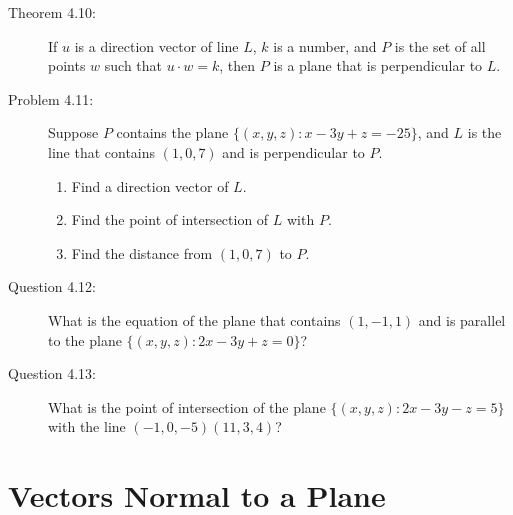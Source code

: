 \documentclass{article}
\begin{document}
\begin{description}
  \item[Theorem 4.10:] If $u$ is a direction vector of line $L$, $k$ is a number, and $P$ is the set of all points $w$ such that $u \cdot w = k$, then $P$ is a plane that is perpendicular to $L$.

  \item[Problem 4.11:] Suppose $P$ contains the plane $\{ (x,y,z): x-3y+z = -25 \}$, and $L$ is the line that contains $(1, 0, 7)$ and is perpendicular to $P$.
    \begin{enumerate}[\hspace{1cm}(a)]
      \item Find a direction vector of $L$.
      \item Find the point of intersection of $L$ with $P$.
      \item Find the distance from $(1, 0, 7)$ to $P$.
    \end{enumerate}

  \item[Question 4.12:] What is the equation of the plane that contains $(1, -1, 1)$ and is parallel to the plane $\{ (x,y,z): 2x-3y+z = 0 \}$?

  \item[Question 4.13:] What is the point of intersection of the plane $\{ (x,y,z): 2x-3y-z = 5 \}$ with the line $(-1, 0, -5) (11, 3, 4)$?

\end{description}


\section{Vectors Normal to a Plane}
\end{document}
